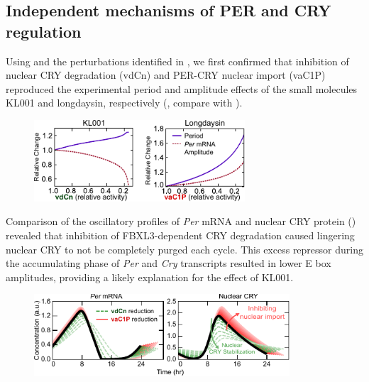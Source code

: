 \subsection{Independent mechanisms of PER and CRY regulation}
Using  and the perturbations identified in , we first confirmed that inhibition of nuclear CRY degradation (vdCn) and PER-CRY nuclear import (vaC1P) reproduced the experimental period and amplitude effects of the small molecules KL001 and longdaysin, respectively (, compare with ). 

\begin{figure}[h]
  \centering
  \includegraphics[width=0.7\textwidth]{chap4/figures/fig4a.pdf}
  \label{fig:44a}
\end{figure}

Comparison of the oscillatory profiles of {\it Per} mRNA and nuclear CRY protein () revealed that inhibition of FBXL3-dependent CRY degradation caused lingering nuclear CRY to not be completely purged each cycle. 
 This excess repressor during the accumulating phase of {\it Per} and {\it Cry} transcripts resulted in lower E box amplitudes, providing a likely explanation for the effect of KL001.

\begin{figure}[h]
  \centering
  \includegraphics[width=0.85\textwidth]{chap4/figures/fig4b.pdf}
  \label{fig:44b}
\end{figure}


